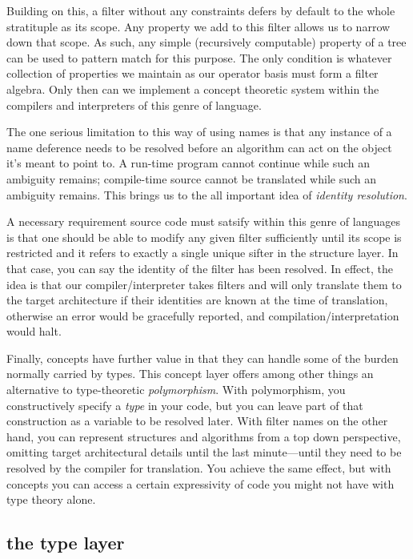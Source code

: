 \documentclass[twoside]{article}
\begin{document}
Building on this, a filter without any constraints defers by default to the whole stratituple as its scope. Any property we add
to this filter allows us to narrow down that scope. As such, any simple (recursively computable) property of a tree can be used
to pattern match for this purpose. The only condition is whatever collection of properties we maintain as our operator basis
must form a filter algebra. Only then can we implement a concept theoretic system within the compilers and interpreters of
this genre of language.

The one serious limitation to this way of using names is that any instance of a name deference needs to be resolved before an
algorithm can act on the object it's meant to point to. A run-time program cannot continue while such an ambiguity remains;
compile-time source cannot be translated while such an ambiguity remains. This brings us to the all important idea of
\emph{identity resolution}.

A necessary requirement source code must satsify within this genre of languages is that one should be able to modify any
given filter sufficiently until its scope is restricted and it refers to exactly a single unique sifter in the structure layer.
In that case, you can say the identity of the filter has been resolved. In effect, the idea is that our compiler/interpreter
takes filters and will only translate them to the target architecture if their identities are known at the time
of translation, otherwise an error would be gracefully reported, and compilation/interpretation would halt.

Finally, concepts have further value in that they can handle some of the burden normally carried by types. This concept layer
offers among other things an alternative to type-theoretic \emph{polymorphism}. With polymorphism, you constructively specify
a \emph{type} in your code, but you can leave part of that construction as a variable to be resolved later. With filter names
on the other hand, you can represent structures and algorithms from a top down perspective, omitting target architectural
details until the last minute---until they need to be resolved by the compiler for translation. You achieve the same effect,
but with concepts you can access a certain expressivity of code you might not have with type theory alone.

\subsection*{the type layer}
\end{document}

